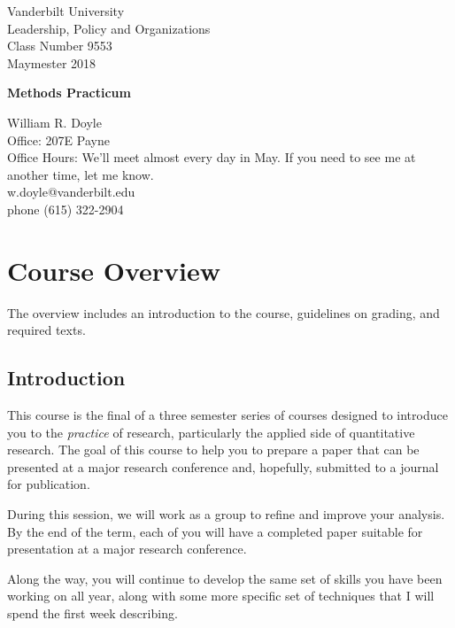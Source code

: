 \documentclass[10pt]{article}
\begin{document}


\thispagestyle{empty}%


\setlength{\parskip}{1ex plus 0.5ex minus 0.2ex}

\setcounter{secnumdepth}{-2}



\begin{flushleft}
Vanderbilt University\\Leadership, Policy and Organizations\\Class Number 9553\\ Maymester 2018\\
\end{flushleft}


\begin{center}
\Large{\textbf{Methods Practicum}}\\
\end{center}

\begin{flushleft}
William R. Doyle\\
Office: 207E Payne\\
Office Hours: We'll meet almost every day in May. If you need to see me at another time, let me know.\\
w.doyle@vanderbilt.edu\\
phone (615) 322-2904\\
\end{flushleft}

\section{Course Overview}%

The overview includes an introduction to the course, guidelines on grading, and required texts.

\subsection{Introduction}%
\begin{flushleft}

  This course is the final of a three semester series of courses
  designed to introduce you to the \textit{practice} of research,
  particularly the applied side of quantitative research. The goal of
  this course to help you to prepare a paper that can be presented at
  a major research conference and, hopefully, submitted to a journal
  for publication.


  During this session, we will work as a group to refine and improve
  your analysis. By the end of the term, each of you will have a
  completed paper suitable for presentation at a major research
  conference.

  Along the way, you will continue to develop the same set of skills
  you have been working on all year, along with some more specific
  set of techniques that I will spend the first week describing.


\end{flushleft}
\end{document}
